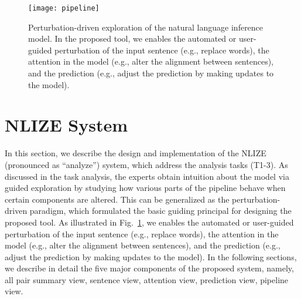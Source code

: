 
\begin{figure}[htbp]
\centering
 \texttt{[image: pipeline]}
 \caption{
Perturbation-driven exploration of the natural language inference model.
In the proposed tool, we enables the automated or user-guided perturbation of the input sentence (e.g., replace words), the attention in the model (e.g., alter the alignment between sentences), and the prediction (e.g., adjust the prediction by making updates to the model).
}
\label{fig:modelPipeline}
\end{figure}

\section{NLIZE System}
In this section, we describe the design and implementation of the NLIZE (pronounced as ``analyze'') system, which address the analysis tasks (T1-3).
%
As discussed in the task analysis, the experts obtain intuition about the model via guided exploration by studying how various parts of the pipeline behave when certain components are altered.
%
This can be generalized as the perturbation-driven paradigm, which formulated the basic guiding principal for designing the proposed tool.
As illustrated in Fig.~\ref{fig:modelPipeline}, we enables the automated or user-guided perturbation of the input sentence (e.g., replace words), the attention in the model (e.g., alter the alignment between sentences), and the prediction (e.g., adjust the prediction by making updates to the model).
%
In the following sections, we describe in detail the five major components of the proposed system, namely, all pair summary view, sentence view, attention view, prediction view, pipeline view.


%
